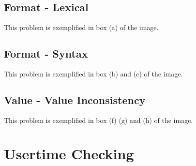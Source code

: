 \documentclass{article}
\begin{document}
\subsection{Format - Lexical}
This problem is exemplified in box (a) of the image.

\subsection{Format - Syntax}
This problem is exemplified in box (b) and (c) of the image.

\subsection{Value - Value Inconsistency}
This problem is exemplified in box (f) (g) and (h) of the image.

\section{Usertime Checking}




\end{document}
